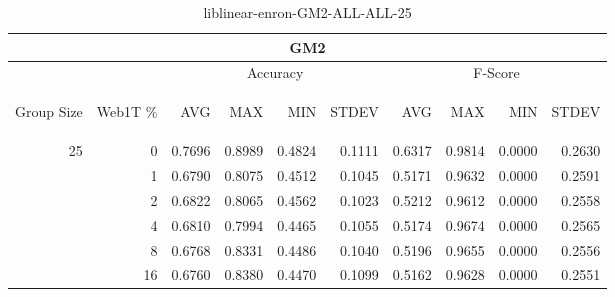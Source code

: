 \begin{center}
\begin{table}[htbp]
\begin{tabular}{ | r | r | r | r | r | r | r | r | r | r |}
\hline
\multicolumn{10}{|c|}{GM2}\\
\hline
 & & \multicolumn{4}{|c|}{Accuracy} & \multicolumn{4}{|c|}{F-Score}\\ \cline{3-10}
\begin{sideways}Group Size\end{sideways} & \begin{sideways}Web1T \%\end{sideways} & \begin{sideways}AVG\end{sideways} & \begin{sideways}MAX\end{sideways} & \begin{sideways}MIN\end{sideways} & \begin{sideways}STDEV\end{sideways} & \begin{sideways}AVG\end{sideways} & \begin{sideways}MAX\end{sideways} & \begin{sideways}MIN\end{sideways} & \begin{sideways}STDEV\end{sideways}\\
\hline
\multirow{6}{*}{25}
 & 0 & 0.7696 & 0.8989 & 0.4824 & 0.1111 & 0.6317 & 0.9814 & 0.0000 & 0.2630\\ \cline{2-10}
 & 1 & 0.6790 & 0.8075 & 0.4512 & 0.1045 & 0.5171 & 0.9632 & 0.0000 & 0.2591\\ \cline{2-10}
 & 2 & 0.6822 & 0.8065 & 0.4562 & 0.1023 & 0.5212 & 0.9612 & 0.0000 & 0.2558\\ \cline{2-10}
 & 4 & 0.6810 & 0.7994 & 0.4465 & 0.1055 & 0.5174 & 0.9674 & 0.0000 & 0.2565\\ \cline{2-10}
 & 8 & 0.6768 & 0.8331 & 0.4486 & 0.1040 & 0.5196 & 0.9655 & 0.0000 & 0.2556\\ \cline{2-10}
 & 16 & 0.6760 & 0.8380 & 0.4470 & 0.1099 & 0.5162 & 0.9628 & 0.0000 & 0.2551\\ \cline{2-10}
\hline
\end{tabular}
\caption{liblinear-enron-GM2-ALL-ALL-25}
\end{table}
\end{center}

